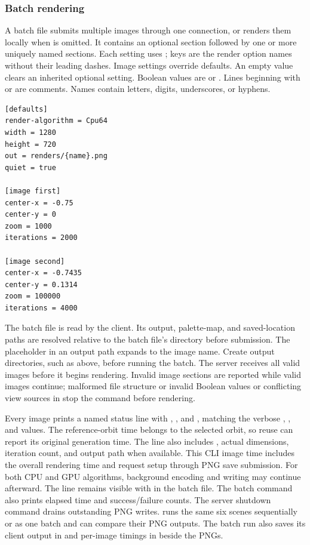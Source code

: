 \subsubsection*{Batch rendering}

A batch file submits multiple images through one connection, or renders them
locally when  is omitted. It contains an optional
\code{[defaults]} section followed by one or more uniquely named
 sections. Each setting uses ; keys are
the render option names without their leading dashes. Image settings override
defaults. An empty value clears an inherited optional setting. Boolean values
are  or . Lines beginning with \code{\#} or
\code{;} are comments. Names contain letters, digits, underscores, or hyphens.

\begin{lstlisting}
[defaults]
render-algorithm = Cpu64
width = 1280
height = 720
out = renders/{name}.png
quiet = true

[image first]
center-x = -0.75
center-y = 0
zoom = 1000
iterations = 2000

[image second]
center-x = -0.7435
center-y = 0.1314
zoom = 100000
iterations = 4000
\end{lstlisting}

The batch file is read by the client. Its output, palette-map, and saved-location
paths are resolved relative to the batch file's directory before submission.
The  placeholder in an output path expands to the image name.
Create output directories, such as  above, before running the batch.
The server receives all valid images before it begins rendering. Invalid image
sections are reported while valid images continue; malformed file structure or
invalid Boolean values or conflicting view sources in \code{[defaults]} stop
the command before rendering.

Every image prints a named status line with ,
, and , matching the verbose
, , and  values.
The reference-orbit time belongs to the selected orbit, so reuse can report its
original generation time. The line also includes , actual
dimensions, iteration count, and output path when available. This CLI image time
includes the overall rendering time and request setup through PNG save
submission. For both CPU and GPU algorithms, background encoding and writing
may continue afterward. The line remains visible with
 in the batch file. The batch command also prints elapsed time
and success/failure counts. The server shutdown command drains outstanding PNG
writes.  runs the same six scenes
sequentially or as one batch and can compare their PNG outputs. The batch run
also saves its client output in  and per-image timings
in  beside the PNGs.

